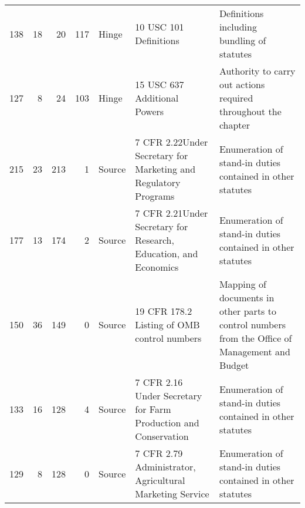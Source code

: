 \begin{tabular}{rrrrlp{}p{}}
   138 &      18 &           20 &          117 & Hinge           & 10 USC 101 Definitions                                                   & Definitions including bundling of statutes                       \\
   127 &       8 &           24 &          103 & Hinge           & 15 USC 637 Additional Powers                                              & Authority to carry out actions required throughout the chapter                      \\
   \rowcolor{lightgray!30}215 &      23 &          213 &            1 & Source          & 7 CFR 2.22\newline Under Secretary for Marketing and Regulatory Programs            & Enumeration of stand-in duties contained in other statutes                       \\
   \rowcolor{lightgray!30}177 &      13 &          174 &            2 & Source          & 7 CFR 2.21\newline Under Secretary for Research, Education, and Economics            &  Enumeration of stand-in duties contained in other statutes                      \\
   \rowcolor{lightgray!30}150 &      36 &          149 &            0 & Source          & 19 CFR 178.2 Listing of OMB control numbers                                 & Mapping of documents in other parts to control numbers from the Office of Management and Budget                      \\
   \rowcolor{lightgray!30}133 &      16 &          128 &            4 & Source          & 7 CFR 2.16 Under Secretary for Farm Production and Conservation              & Enumeration of stand-in duties contained in other statutes                     \\
   \rowcolor{lightgray!30}129 &       8 &          128 &            0 & Source          & 7 CFR 2.79 Administrator, Agricultural Marketing Service                     & Enumeration of stand-in duties contained in other statutes                          \\
\bottomrule
\end{tabular}